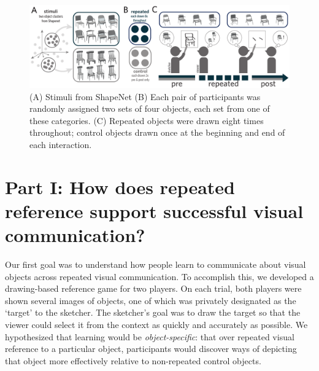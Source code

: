 \documentclass[10pt,letterpaper]{article}
\begin{document}
\begin{figure}
\begin{center}
\includegraphics[width=0.95\linewidth]{figures/task_stimuli.pdf}
\caption{(A) Stimuli from ShapeNet (B) Each pair of participants was randomly assigned two sets of four objects, each set from one of these categories. (C) Repeated objects were drawn eight times throughout; control objects drawn once at the beginning and end of each interaction.}
\label{task_stimuli}
\vspace{-1em}
\end{center}
\end{figure}

\section{Part I: How does repeated reference support successful visual communication?}

Our first goal was to understand how people learn to communicate about visual objects across repeated visual communication. 
To accomplish this, we developed a drawing-based reference game for two players. 
On each trial, both players were shown several images of objects, one of which was privately designated as the `target' to the sketcher. 
The sketcher's goal was to draw the target so that the viewer could select it from the context as quickly and accurately as possible. 
We hypothesized that learning would be \emph{object-specific}: that over repeated visual reference to a particular object, participants would discover ways of depicting that object more effectively relative to non-repeated control objects. 

\end{document}
